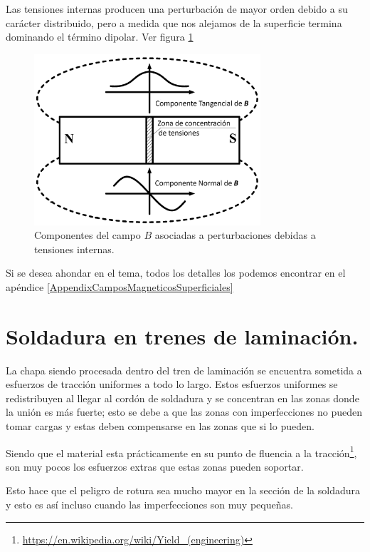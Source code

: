 Las tensiones internas producen una perturbación de mayor orden debido a su carácter distribuido, pero a medida que nos alejamos de la superficie termina dominando el término dipolar. Ver figura \ref{fig:metals-09-00661-g001a}

\begin{figure}[H]
	\centering
	\includegraphics[width=0.75\textwidth]{./Figures/metals-09-00661-g001.jpg}
	\caption{Componentes del campo $B$ asociadas a perturbaciones debidas a tensiones internas\protect\footnotemark.}
	\label{fig:metals-09-00661-g001a}
\end{figure}


Si se desea ahondar en el tema, todos los detalles los podemos encontrar en el apéndice \ref{AppendixCamposMagneticosSuperficiales} 


\section{Soldadura en trenes de laminación.}


La chapa siendo procesada dentro del tren de laminación se encuentra sometida a esfuerzos de tracción uniformes a todo lo largo. Estos esfuerzos uniformes se redistribuyen al llegar al cordón de soldadura y se concentran en las zonas donde la unión es más fuerte; esto se debe a que las zonas con imperfecciones no pueden tomar cargas y estas deben compensarse en las zonas que si lo pueden. 

Siendo que el material esta prácticamente en su punto de fluencia a la tracción\footnote{\url{https://en.wikipedia.org/wiki/Yield\_(engineering)}}, son muy pocos los esfuerzos extras que estas zonas pueden soportar. 

Esto hace que el peligro de rotura sea mucho mayor en la sección de la soldadura y esto es así incluso cuando las imperfecciones son muy pequeñas. 



